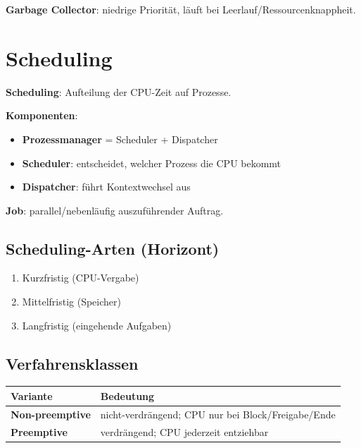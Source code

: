 \documentclass[11pt, a4paper]{article}
\begin{document}
\textbf{Garbage Collector}: niedrige Priorität, läuft bei Leerlauf/Ressourcenknappheit.



\section{Scheduling}

\textbf{Scheduling}: Aufteilung der CPU-Zeit auf Prozesse.


\textbf{Komponenten}:

\begin{itemize}
  \item \textbf{Prozessmanager} = Scheduler + Dispatcher
  \item \textbf{Scheduler}: entscheidet, welcher Prozess die CPU bekommt
  \item \textbf{Dispatcher}: führt Kontextwechsel aus
\end{itemize}

\textbf{Job}: parallel/nebenläufig auszuführender Auftrag.



\subsection{Scheduling-Arten (Horizont)}
\begin{enumerate}
  \item Kurzfristig (CPU-Vergabe)
  \item Mittelfristig (Speicher)
  \item Langfristig (eingehende Aufgaben)
\end{enumerate}


\subsection{Verfahrensklassen}

{\small
\begin{tabularx}{\linewidth}{XX}
\hline
\rowcolor{tableheadbg}
{\color{white}\textbf{Variante}} & {\color{white}\textbf{Bedeutung}} \\[2pt]
\hline
\endhead
\hline
\endfoot
\textbf{Non-preemptive} & nicht-verdrängend; CPU nur bei Block/Freigabe/Ende \\
\textbf{Preemptive} & verdrängend; CPU jederzeit entziehbar \\
\end{tabularx}
}
\end{document}
